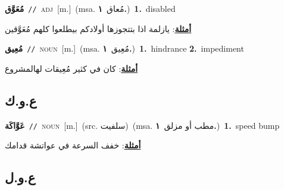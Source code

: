 \documentclass[10pt,a4paper,twoside]{article} %
\begin{document}
\begin{multicols}{2}
{\setlength\topsep{0pt}\textbf{\foreignlanguage{arabic}{مُعَوَّق}}\ {\color{gray}\texttt{//}\color{black}}\ \textsc{adj}\ [m.]\ \color{gray}(msa. \foreignlanguage{arabic}{مُعاق}~\foreignlanguage{arabic}{\textbf{١.}})\color{black}\ \textbf{1.}~disabled\  \begin{flushright}\color{gray}\foreignlanguage{arabic}{\textbf{\underline{\foreignlanguage{arabic}{أمثلة}}}: يازلمة اذا بتتجوزها أولادكم بيطلعوا كلهم مُعَوَّقين}\end{flushright}\color{black}} \vspace{2mm}

{\setlength\topsep{0pt}\textbf{\foreignlanguage{arabic}{مُعِيق}}\ {\color{gray}\texttt{//}\color{black}}\ \textsc{noun}\ [m.]\ \color{gray}(msa. \foreignlanguage{arabic}{مُعِيق}~\foreignlanguage{arabic}{\textbf{١.}})\color{black}\ \textbf{1.}~hindrance  \textbf{2.}~impediment\  \begin{flushright}\color{gray}\foreignlanguage{arabic}{\textbf{\underline{\foreignlanguage{arabic}{أمثلة}}}: كان في كثير مُعِيقات لهالمشروع}\end{flushright}\color{black}} \vspace{2mm}

\vspace{-3mm}
\subsection*{\color{blue}\foreignlanguage{arabic}{ع.و.ك}\color{blue}{ (ntws)}} 

{\setlength\topsep{0pt}\textbf{\foreignlanguage{arabic}{عَوَّاكَة}}\ {\color{gray}\texttt{//}\color{black}}\ \textsc{noun}\ [m.]\ (src. \color{gray}\foreignlanguage{arabic}{سلفيت}\color{black})\ \color{gray}(msa. \foreignlanguage{arabic}{مطب أو مزلق}~\foreignlanguage{arabic}{\textbf{١.}})\color{black}\ \textbf{1.}~speed bump\  \begin{flushright}\color{gray}\foreignlanguage{arabic}{\textbf{\underline{\foreignlanguage{arabic}{أمثلة}}}: خفف السرعة في عواتشة قدامك}\end{flushright}\color{black}} \vspace{2mm}

\vspace{-3mm}
\subsection*{\color{blue}\foreignlanguage{arabic}{ع.و.ل}\color{blue}{}} 


\end{multicols}
\end{document}
